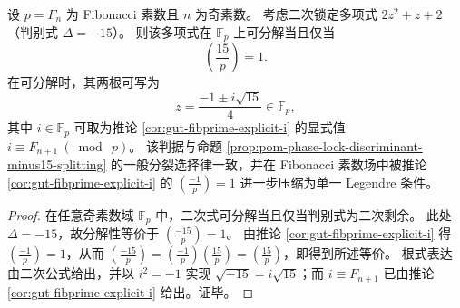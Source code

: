 \begin{corollary}\label{cor:gut-fibprime-disc-minus15-criterion}
设 \(p=F_n\) 为 Fibonacci 素数且 \(n\) 为奇素数。
考虑二次锁定多项式 \(2z^2+z+2\)（判别式 \(\Delta=-15\)）。
则该多项式在 \(\mathbb{F}_p\) 上可分解当且仅当
\[
\left(\frac{15}{p}\right)=1.
\]
在可分解时，其两根可写为
\[
z=\frac{-1\pm i\sqrt{15}}{4}\in\mathbb{F}_p,
\]
其中 \(i\in\mathbb{F}_p\) 可取为推论 \ref{cor:gut-fibprime-explicit-i} 的显式值 \(i\equiv F_{n+1}\ (\bmod\ p)\)。
该判据与命题 \ref{prop:pom-phase-lock-discriminant-minus15-splitting} 的一般分裂选择律一致，并在 Fibonacci 素数场中被推论 \ref{cor:gut-fibprime-explicit-i} 的 \(\left(\frac{-1}{p}\right)=1\) 进一步压缩为单一 Legendre 条件。
\end{corollary}
\begin{proof}
在任意奇素数域 \(\mathbb{F}_p\) 中，二次式可分解当且仅当判别式为二次剩余。
此处 \(\Delta=-15\)，故分解性等价于 \(\left(\frac{-15}{p}\right)=1\)。
由推论 \ref{cor:gut-fibprime-explicit-i} 得 \(\left(\frac{-1}{p}\right)=1\)，从而
\(
\left(\frac{-15}{p}\right)=\left(\frac{-1}{p}\right)\left(\frac{15}{p}\right)=\left(\frac{15}{p}\right)
\)，即得到所述等价。
根式表达由二次公式给出，并以 \(i^2=-1\) 实现 \(\sqrt{-15}=i\sqrt{15}\)；而 \(i\equiv F_{n+1}\) 已由推论 \ref{cor:gut-fibprime-explicit-i} 给出。证毕。
\end{proof}

\endinput
